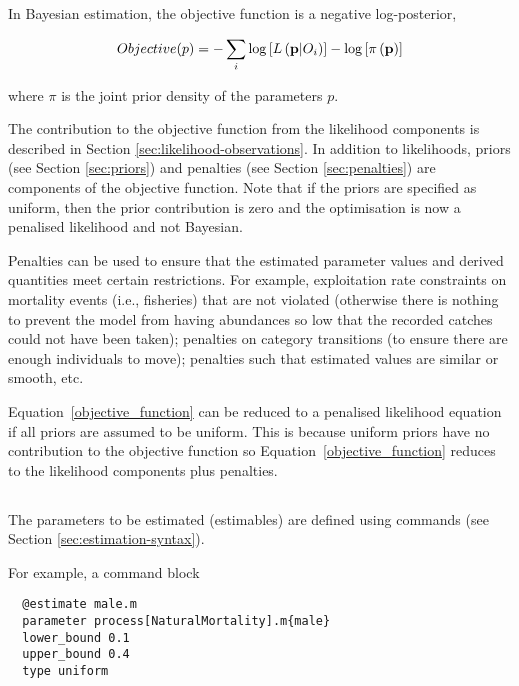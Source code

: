 In Bayesian estimation, the objective function is a negative log-posterior,

\begin{equation}\label{objective_function}
Objective(p)= - \sum\limits_i {\log \left[ {L\left( {{\bf{p}}|O_i } \right)} \right]}  - \log \left[ {\pi \left( {\bf{p}} \right)} \right]
\end{equation}

where $\pi$ is the joint prior density of the parameters $p$.

The contribution to the objective function from the likelihood components is described in Section \ref{sec:likelihood-observations}. In addition to likelihoods, priors (see Section \ref{sec:priors}) and penalties (see Section \ref{sec:penalties}) are components of the objective function. Note that if the priors are specified as uniform, then the prior contribution is zero and the optimisation is now a penalised likelihood and not Bayesian.

Penalties can be used to ensure that the estimated parameter values and derived quantities meet certain restrictions. For example, exploitation rate constraints on mortality events (i.e., fisheries) that are not violated (otherwise there is nothing to prevent the model from having abundances so low that the recorded catches could not have been taken); penalties on category transitions (to ensure there are enough individuals to move); penalties such that estimated values are similar or smooth, etc.

Equation~\ref{objective_function} can be reduced to a penalised likelihood equation if all priors are assumed to be uniform. This is because uniform priors have no contribution to the objective function so Equation~\ref{objective_function} reduces to the likelihood components plus penalties.

\subsection{\label{sec:estimate-free-parameters}}

The parameters to be estimated (estimables) are defined using  commands (see Section \ref{sec:estimation-syntax}).

For example, a  command block 

{\small{\begin{verbatim}
  @estimate male.m
  parameter process[NaturalMortality].m{male}
  lower_bound 0.1
  upper_bound 0.4
  type uniform
\end{verbatim}}}

